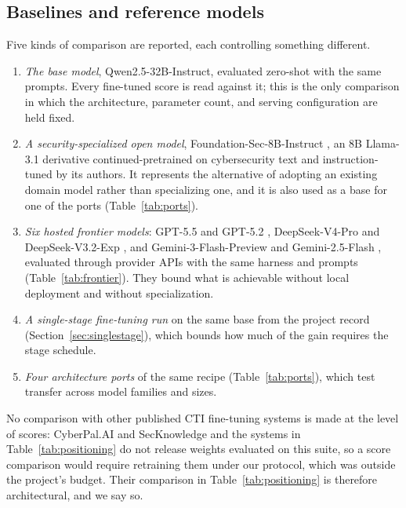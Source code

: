 \documentclass[preprint,12pt,authoryear]{elsarticle}
\begin{document}
\subsection{Baselines and reference models}\label{sec:baselines}
Five kinds of comparison are reported, each controlling something different.
\begin{enumerate}
\item \emph{The base model}, Qwen2.5-32B-Instruct, evaluated zero-shot with the same prompts. Every fine-tuned score is read against it; this is the only comparison in which the architecture, parameter count, and serving configuration are held fixed.
\item \emph{A security-specialized open model}, Foundation-Sec-8B-Instruct \citep{kassianik2025foundationsec}, an 8B Llama-3.1 derivative continued-pretrained on cybersecurity text and instruction-tuned by its authors. It represents the alternative of adopting an existing domain model rather than specializing one, and it is also used as a base for one of the ports (Table~\ref{tab:ports}).
\item \emph{Six hosted frontier models}: GPT-5.5 and GPT-5.2 \citep{openai2026gpt55,openai2025gpt52}, DeepSeek-V4-Pro and DeepSeek-V3.2-Exp \citep{deepseek2026v4,deepseek2025v32exp}, and Gemini-3-Flash-Preview and Gemini-2.5-Flash \citep{google2025gemini3flash,comanici2025gemini25}, evaluated through provider APIs with the same harness and prompts (Table~\ref{tab:frontier}). They bound what is achievable without local deployment and without specialization.
\item \emph{A single-stage fine-tuning run} on the same base from the project record (Section~\ref{sec:singlestage}), which bounds how much of the gain requires the stage schedule.
\item \emph{Four architecture ports} of the same recipe (Table~\ref{tab:ports}), which test transfer across model families and sizes.
\end{enumerate}
No comparison with other published CTI fine-tuning systems is made at the level of scores: CyberPal.AI and SecKnowledge \citep{levi2025cyberpal} and the systems in Table~\ref{tab:positioning} do not release weights evaluated on this suite, so a score comparison would require retraining them under our protocol, which was outside the project's budget. Their comparison in Table~\ref{tab:positioning} is therefore architectural, and we say so.
\end{document}
